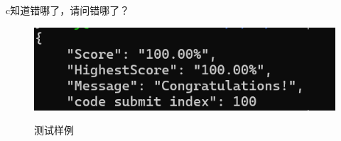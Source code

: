 c知道错哪了，请问错哪了？
	\begin{figure}[H]
		\centering
		\includegraphics[width=1\textwidth]{11.png}\\
		\caption{测试样例}
		\label{fig:11}
	\end{figure}  


